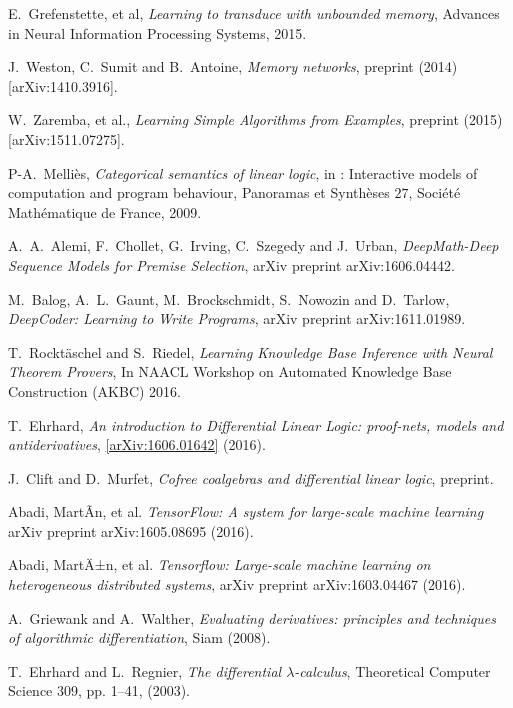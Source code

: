 \documentclass[english,letter paper,12pt,leqno]{article}
\theoremstyle{example}
\numberwithin{equation}{section}
\begin{document}
\begin{thebibliography}{BHLS03}
E.~Grefenstette, et al, \textsl{Learning to transduce with unbounded memory}, Advances in Neural Information Processing Systems, 2015.

J.~Weston, C.~Sumit and B.~Antoine, \textsl{Memory networks}, preprint (2014) [arXiv:1410.3916].

W.~Zaremba, et al., \textsl{Learning Simple Algorithms from Examples}, preprint (2015) [arXiv:1511.07275].

P-A.~Melli\`{e}s, \textsl{Categorical semantics of linear logic}, in : Interactive models of computation and program behaviour, Panoramas et Synth\`{e}ses $27$, Soci\'{e}t\'{e} Math\'{e}matique de France, 2009.

A.~A.~Alemi, F.~Chollet, G.~Irving, C.~Szegedy and J.~Urban, \textsl{DeepMath-Deep Sequence Models for Premise Selection}, arXiv preprint arXiv:1606.04442.

M.~Balog, A.~L.~Gaunt, M.~Brockschmidt, S.~Nowozin and D.~Tarlow, \textsl{DeepCoder: Learning to Write Programs}, arXiv preprint arXiv:1611.01989.

T.~Rockt\"aschel and S.~Riedel, \textsl{Learning Knowledge Base Inference with Neural Theorem Provers}, In NAACL Workshop on Automated Knowledge Base Construction (AKBC) 2016.

T.~Ehrhard, \textsl{An introduction to Differential Linear Logic: proof-nets, models and antiderivatives}, \href{https://arxiv.org/abs/1606.01642}{[arXiv:1606.01642]} (2016).

J.~Clift and D.~Murfet, \textsl{Cofree coalgebras and differential linear logic}, preprint.

Abadi, MartÃ­n, et al. \textsl{TensorFlow: A system for large-scale machine learning} arXiv preprint arXiv:1605.08695 (2016).

Abadi, MartÄ±n, et al. \textsl{Tensorflow: Large-scale machine learning on heterogeneous distributed systems}, arXiv preprint arXiv:1603.04467 (2016).

A.~Griewank and A.~Walther, \textsl{Evaluating derivatives: principles and techniques of algorithmic differentiation}, Siam (2008).

T.~Ehrhard and L.~Regnier, \textsl{The differential $\lambda$-calculus}, Theoretical Computer Science 309, pp. 1--41, (2003).


\end{thebibliography}
\end{document}
